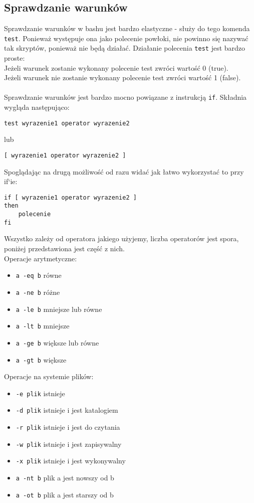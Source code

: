 \documentclass[10 pt, a4paper]{article}
\begin{document}
\subsection{Sprawdzanie warunków}
Sprawdzanie warunków w bashu jest bardzo elastyczne - służy do tego komenda \texttt{test}. Ponieważ występuje ona jako polecenie powłoki, nie powinno się nazywać tak skryptów, ponieważ nie będą działać. Działanie polecenia \texttt{test} jest bardzo proste:\\
Jeżeli warunek zostanie wykonany polecenie test zwróci wartość 0 (true).\\
Jeżeli warunek nie zostanie wykonany polecenie test zwróci wartość 1 (false).\\\\
Sprawdzanie warunków jest bardzo mocno powiązane z instrukcją \texttt{if}. Składnia wygląda następująco:
\begin{lstlisting}
test wyrazenie1 operator wyrazenie2
\end{lstlisting}
lub
\begin{lstlisting}
[ wyrazenie1 operator wyrazenie2 ]
\end{lstlisting}
Spoglądając na drugą możliwość od razu widać jak łatwo wykorzystać to przy if`ie:
\begin{lstlisting}
if [ wyrazenie1 operator wyrazenie2 ]
then
	polecenie
fi
\end{lstlisting}
Wszystko zależy od operatora jakiego użyjemy, liczba operatorów jest spora, poniżej przedstawiona jest część z nich.\\
Operacje arytmetyczne:
\begin{itemize}[itemsep=0cm,leftmargin=1cm]
\item \texttt{a -eq b} równe
\item \texttt{a -ne b} różne
\item \texttt{a -le b} mniejsze lub równe
\item \texttt{a -lt b} mniejsze
\item \texttt{a -ge b} większe lub równe
\item \texttt{a -gt b} większe
\end{itemize}
Operacje na systemie plików:
\begin{itemize}[itemsep=0cm,leftmargin=1cm]
\item \texttt{-e plik} istnieje
\item \texttt{-d plik} istnieje i jest katalogiem
\item \texttt{-r plik} istnieje i jest do czytania
\item \texttt{-w plik} istnieje i jest zapisywalny
\item \texttt{-x plik} istnieje i jest wykonywalny
\item \texttt{a -nt b} plik a jest nowszy od b
\item \texttt{a -ot b} plik a jest starszy od b
\end{itemize}
\end{document}
